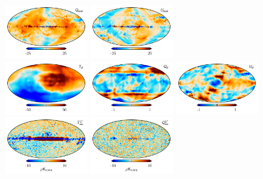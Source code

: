 \documentclass[twocolumn]{../../common/aa}
\begin{document}
\begin{figure}[t]
	\includegraphics[width=0.32\textwidth]{figures/K_leak_Q.pdf}
	\includegraphics[width=0.32\textwidth]{figures/K_leak_U.pdf}\\
	\includegraphics[width=0.32\textwidth]{figures/K_sl_I.pdf}
	\includegraphics[width=0.32\textwidth]{figures/K_sl_Q.pdf}
	\includegraphics[width=0.32\textwidth]{figures/K_sl_U.pdf}\\
	\includegraphics[width=0.32\textwidth]{figures/K_res_I.pdf}
	\includegraphics[width=0.32\textwidth]{figures/K_res_Q.pdf}

\end{figure}
\end{document}
